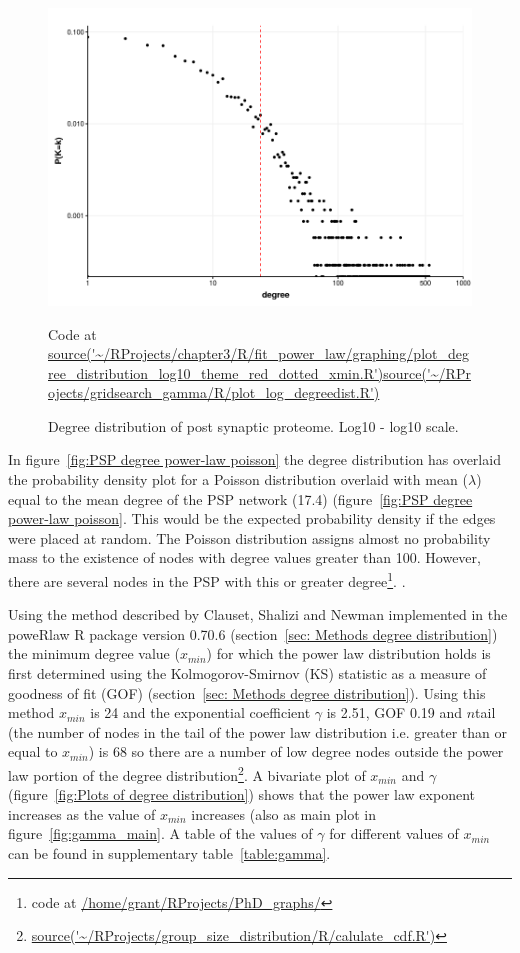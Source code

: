 \begin{figure}
    \includegraphics[width=12cm]{images/chapter3/poweRlaw/Rplot_degree_distribution_log10pktheme.png}
    \caption{Degree distribution of post synaptic proteome. Log10 - log10 scale.}
    \tiny Code at \url{source('~/RProjects/chapter3/R/fit_power_law/graphing/plot_degree_distribution_log10_theme_red_dotted_xmin.R')}\url{source('~/RProjects/gridsearch_gamma/R/plot_log_degreedist.R') }
    \label{fig:Degree distribution of post synaptic proteome. Log10 - log10 scale1}
\end{figure}

In figure~\ref{fig:PSP degree power-law poisson} the degree distribution has overlaid the probability density plot for a Poisson distribution overlaid with mean ($\lambda$) equal to the mean degree of the PSP network (17.4) (figure~\ref{fig:PSP degree power-law poisson}. This would be the expected probability density if the edges were placed at random. The Poisson distribution assigns almost no probability mass to the existence of nodes with degree values greater than 100. However, there are several nodes in the PSP with this or greater degree\footnote{code at \url{/home/grant/RProjects/PhD_graphs/}}.
.

Using the method described by Clauset, Shalizi and Newman \cite{clauset2009power} implemented in the poweRlaw R package version 0.70.6 \cite{gillespie2015fitting} (section~\ref{sec: Methods degree distribution}) the minimum degree value ($x_{min}$) for which the power law distribution holds is first determined using the Kolmogorov-Smirnov (KS) statistic as a measure of goodness of fit (GOF) (section~\ref{sec: Methods degree distribution}). Using this method $x_{min}$ is 24 and the exponential coefficient $\gamma$ is 2.51, GOF 0.19 and  $n$tail (the number of nodes in the tail of the power law distribution i.e. greater than or equal to $x_{min}$) is 68 so there are a number of low degree  nodes outside the power law portion of the degree distribution\footnote{\url{source('~/RProjects/group_size_distribution/R/calulate_cdf.R')}}. A bivariate plot of $x_{min}$ and $\gamma$ (figure~\ref{fig:Plots of degree distribution}) shows that the power law exponent increases as the value of $x_{min}$ increases (also as main plot in figure~\ref{fig:gamma_main}. A table of the values of $\gamma$ for different values of $x_{min}$ can be found in supplementary table~\ref{table:gamma}.

